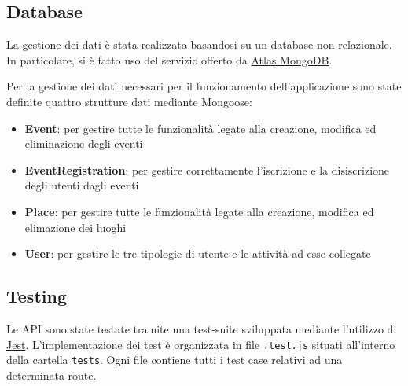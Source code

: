 \documentclass[9pt]{extarticle}
\begin{document}
\subsection{Database}

La gestione dei dati è stata realizzata basandosi su un database non
relazionale. In particolare, si è fatto uso del servizio offerto da
\href{https://www.mongodb.com/products/platform/atlas-database}{Atlas MongoDB}.

Per la gestione dei dati necessari per il funzionamento dell'applicazione sono state definite quattro strutture dati mediante Mongoose:
\begin{itemize}
	\item \textbf{Event}: per gestire tutte le funzionalità legate alla creazione, modifica ed eliminazione degli eventi
	\item \textbf{EventRegistration}: per gestire correttamente l'iscrizione e la disiscrizione degli utenti dagli eventi
	\item \textbf{Place}: per gestire tutte le funzionalità legate alla creazione, modifica ed elimazione dei luoghi
	\item \textbf{User}: per gestire le tre tipologie di utente e le attività ad esse collegate
\end{itemize}

\newpage
\subsection{Testing}

Le API sono state testate tramite una test-suite sviluppata mediante l'utilizzo di \href{https://jestjs.io/}{Jest}. L’implementazione dei test è organizzata in file \verb|.test.js| situati all'interno della cartella \verb*|tests|. Ogni file contiene tutti i test case relativi ad una determinata route.
\end{document}
